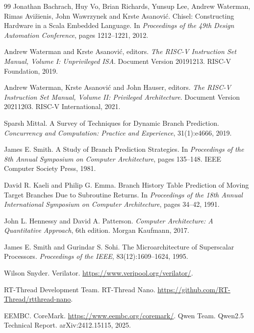 \documentclass[UTF8,a4paper,12pt,fontset=none,scheme=plain]{ctexart}
\begin{document}
\begingroup
\small
{}
\begin{thebibliography}{99}
  Jonathan Bachrach, Huy Vo, Brian Richards, Yunsup Lee, Andrew Waterman, Rimas Avižienis,
  John Wawrzynek and Krste Asanović. Chisel: Constructing Hardware in a Scala Embedded Language.
  In \emph{Proceedings of the 49th Design Automation Conference}, pages 1212--1221, 2012.

  Andrew Waterman and Krste Asanović, editors. \emph{The RISC-V Instruction Set Manual,
  Volume I: Unprivileged ISA}. Document Version 20191213. RISC-V Foundation, 2019.

  Andrew Waterman, Krste Asanović and John Hauser, editors. \emph{The RISC-V Instruction Set
  Manual, Volume II: Privileged Architecture}. Document Version 20211203. RISC-V International, 2021.

  Sparsh Mittal. A Survey of Techniques for Dynamic Branch Prediction. \emph{Concurrency and
  Computation: Practice and Experience}, 31(1):e4666, 2019.

  James E. Smith. A Study of Branch Prediction Strategies. In \emph{Proceedings of the 8th
  Annual Symposium on Computer Architecture}, pages 135--148. IEEE Computer Society Press, 1981.

  David R. Kaeli and Philip G. Emma. Branch History Table Prediction of Moving Target Branches
  Due to Subroutine Returns. In \emph{Proceedings of the 18th Annual International Symposium on
  Computer Architecture}, pages 34--42, 1991.

  John L. Hennessy and David A. Patterson. \emph{Computer Architecture: A Quantitative Approach},
  6th edition. Morgan Kaufmann, 2017.

  James E. Smith and Gurindar S. Sohi. The Microarchitecture of Superscalar Processors.
  \emph{Proceedings of the IEEE}, 83(12):1609--1624, 1995.

  Wilson Snyder. Verilator. \url{https://www.veripool.org/verilator/}.

  RT-Thread Development Team. RT-Thread Nano. \url{https://github.com/RT-Thread/rtthread-nano}.

  EEMBC. CoreMark. \url{https://www.eembc.org/coremark/}.
  Qwen Team. Qwen2.5 Technical Report. arXiv:2412.15115, 2025.


\end{thebibliography}
\end{document}
